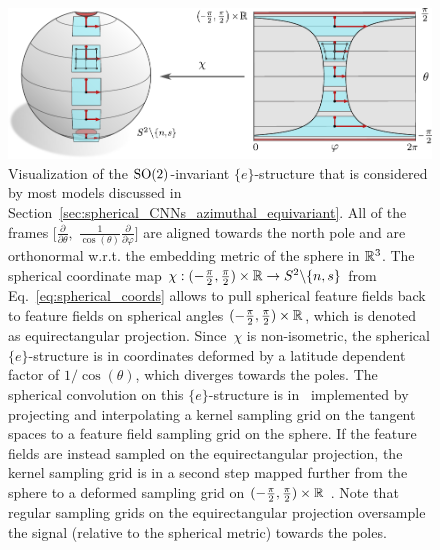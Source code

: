\begin{figure}
    \centering
    \includegraphics[width=.90\textwidth]{figures/G_structure_spherical_equirectangular_1.pdf}
    \caption{\small
        Visualization of the $\operatorname{SO}(2)$-invariant $\{e\}$-structure that is considered by most models discussed in Section~\ref{sec:spherical_CNNs_azimuthal_equivariant}.
        All of the frames 
        $\big[ \frac{\partial}{\partial\theta} ,\; \frac{1}{\cos(\theta)} \frac{\partial}{\partial\varphi} \big]$
        are aligned towards the north pole and are orthonormal w.r.t. the embedding metric of the sphere in $\mathbb{R}^3$.
        The spherical coordinate map
        $\chi: (-\frac{\pi}{2}, \frac{\pi}{2}) \times \mathbb{R} \to S^2 \backslash \{n,s\}$ from Eq.~\eqref{eq:spherical_coords}
        allows to pull spherical feature fields back to feature fields on spherical angles $(-\frac{\pi}{2}, \frac{\pi}{2}) \times \mathbb{R}$, which is denoted as equirectangular projection.
        Since~$\chi$ is non-isometric, the spherical $\{e\}$-structure is in coordinates deformed by a latitude dependent factor of $1/\cos(\theta)$, which diverges towards the poles.
        The spherical convolution on this $\{e\}$-structure is in~\cite{coors2018spherenet,eder2019convolutions,martin2020panoramic} implemented by projecting and interpolating a kernel sampling grid on the tangent spaces to a feature field sampling grid on the sphere.
        If the feature fields are instead sampled on the equirectangular projection, the kernel sampling grid is in a second step mapped further from the sphere to a deformed sampling grid on $(-\frac{\pi}{2}, \frac{\pi}{2}) \times \mathbb{R}$ \cite{zhao2018distortion,tateno2018distortion}.
        Note that regular sampling grids on the equirectangular projection oversample the signal (relative to the spherical metric) towards the poles.
    }
    \label{fig:spherical_equirectangular_1}
\end{figure}


